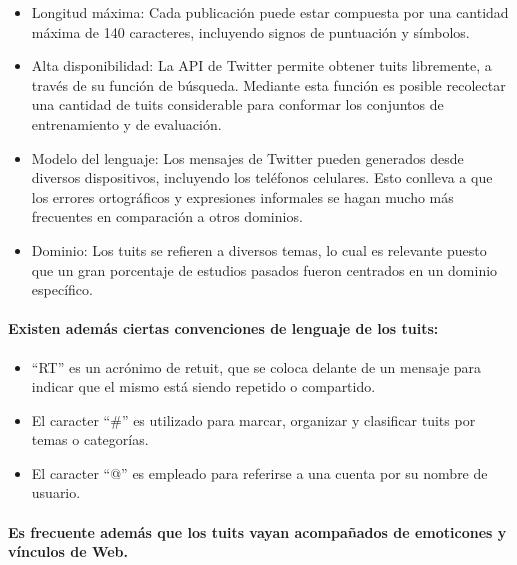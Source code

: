 \begin{itemize}
\item Longitud m\'axima: Cada publicaci\'on puede estar compuesta por una cantidad m\'axima de 140 caracteres, incluyendo signos de puntuaci\'on y s\'imbolos.
\item Alta disponibilidad: La API de Twitter permite obtener tuits libremente, a trav\'es de su funci\'on de b\'usqueda. Mediante esta funci\'on es posible recolectar una cantidad de tuits considerable para conformar los conjuntos de entrenamiento y de evaluaci\'on.
\item Modelo del lenguaje: Los mensajes de Twitter pueden generados desde diversos dispositivos, incluyendo los tel\'efonos celulares. Esto conlleva a que los errores ortogr\'aficos y expresiones informales se hagan mucho m\'as frecuentes en comparaci\'on a otros dominios.
\item Dominio: Los tuits se refieren a diversos temas, lo cual es relevante puesto que un gran porcentaje de estudios pasados fueron centrados en un dominio espec\'ifico.
\end{itemize}

\paragraph{Existen adem\'as ciertas convenciones de lenguaje de los tuits:}
\begin{itemize}
\item ``RT'' es un acr\'onimo de retuit, que se coloca delante de un mensaje para indicar que el mismo est\'a siendo repetido o compartido.
\item El caracter ``\#'' es utilizado para marcar, organizar y clasificar tuits por temas o categor\'ias.
\item El caracter ``@'' es empleado para referirse a una cuenta por su nombre de usuario.
\end{itemize}
\paragraph{Es frecuente adem\'as que los tuits vayan acompa\~nados de emoticones y v\'inculos de Web.}
